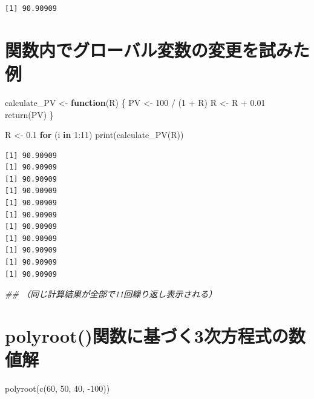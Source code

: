 \documentclass[
  letterpaper,
  DIV=11,
  numbers=noendperiod]{scrreprt}
\newenvironment{Shaded}{\begin{snugshade}}{\end{snugshade}}
\newcommand{\ControlFlowTok}[1]{\textcolor[rgb]{0.00,0.23,0.31}{\textbf{#1}}}
\newcommand{\DecValTok}[1]{\textcolor[rgb]{0.68,0.00,0.00}{#1}}
\newcommand{\DocumentationTok}[1]{\textcolor[rgb]{0.37,0.37,0.37}{\textit{#1}}}
\newcommand{\FloatTok}[1]{\textcolor[rgb]{0.68,0.00,0.00}{#1}}
\newcommand{\FunctionTok}[1]{\textcolor[rgb]{0.28,0.35,0.67}{#1}}
\newcommand{\NormalTok}[1]{\textcolor[rgb]{0.00,0.23,0.31}{#1}}
\newcommand{\OtherTok}[1]{\textcolor[rgb]{0.00,0.23,0.31}{#1}}
\newcommand{\SpecialCharTok}[1]{\textcolor[rgb]{0.37,0.37,0.37}{#1}}
\begin{document}
\begin{verbatim}
[1] 90.90909
\end{verbatim}

\section{関数内でグローバル変数の変更を試みた例}\label{ux95a2ux6570ux5185ux3067ux30b0ux30edux30fcux30d0ux30ebux5909ux6570ux306eux5909ux66f4ux3092ux8a66ux307fux305fux4f8b}

\begin{Shaded}
\begin{Highlighting}[]
\NormalTok{calculate\_PV }\OtherTok{\textless{}{-}} \ControlFlowTok{function}\NormalTok{(R) \{}
\NormalTok{  PV }\OtherTok{\textless{}{-}} \DecValTok{100} \SpecialCharTok{/}\NormalTok{ (}\DecValTok{1} \SpecialCharTok{+}\NormalTok{ R)}
\NormalTok{  R }\OtherTok{\textless{}{-}}\NormalTok{ R }\SpecialCharTok{+} \FloatTok{0.01}
  \FunctionTok{return}\NormalTok{(PV)}
\NormalTok{\}}

\NormalTok{R }\OtherTok{\textless{}{-}} \FloatTok{0.1}
\ControlFlowTok{for}\NormalTok{ (i }\ControlFlowTok{in} \DecValTok{1}\SpecialCharTok{:}\DecValTok{11}\NormalTok{) }\FunctionTok{print}\NormalTok{(}\FunctionTok{calculate\_PV}\NormalTok{(R))}
\end{Highlighting}
\end{Shaded}

\begin{verbatim}
[1] 90.90909
[1] 90.90909
[1] 90.90909
[1] 90.90909
[1] 90.90909
[1] 90.90909
[1] 90.90909
[1] 90.90909
[1] 90.90909
[1] 90.90909
[1] 90.90909
\end{verbatim}

\begin{Shaded}
\begin{Highlighting}[]
\DocumentationTok{\#\# （同じ計算結果が全部で11回繰り返し表示される）}
\end{Highlighting}
\end{Shaded}

\section{polyroot()関数に基づく3次方程式の数値解}\label{polyrootux95a2ux6570ux306bux57faux3065ux304f3ux6b21ux65b9ux7a0bux5f0fux306eux6570ux5024ux89e3}

\begin{Shaded}
\begin{Highlighting}[]
\FunctionTok{polyroot}\NormalTok{(}\FunctionTok{c}\NormalTok{(}\DecValTok{60}\NormalTok{, }\DecValTok{50}\NormalTok{, }\DecValTok{40}\NormalTok{, }\SpecialCharTok{{-}}\DecValTok{100}\NormalTok{))}
\end{Highlighting}
\end{Shaded}
\end{document}
